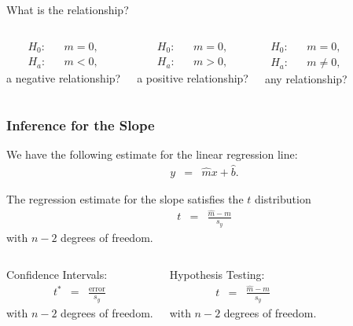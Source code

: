 \begin{frame}{What is the relationship?}


    \begin{columns}

      \begin{eqnarray*}
        H_0: & & m=0, \\
        H_a: & & m<0,
      \end{eqnarray*}
      a negative relationship?


      \begin{eqnarray*}
        H_0: & & m=0, \\
        H_a: & & m>0,
      \end{eqnarray*}
      a positive relationship?



      \begin{eqnarray*}
        H_0: & & m=0, \\
        H_a: & & m\neq 0,
      \end{eqnarray*}
      any relationship?

      
    \end{columns}

  
\end{frame}

\begin{frame}
  \frametitle{Inference for the Slope}

  We have the following estimate for the linear regression line:
  \begin{eqnarray*}
    y & = & \hat{m} x + \hat{b}.
  \end{eqnarray*}

  \begin{definition}
    The regression estimate for the slope satisfies the $t$ distribution
    \begin{eqnarray*}
      t & = & \frac{\hat{m}-m}{s_y}
    \end{eqnarray*}
    with $n-2$ degrees of freedom.
  \end{definition}

  \begin{columns}

    Confidence Intervals:
    \begin{eqnarray*}
      t^* & = & \frac{\mathrm{error}}{s_y}
    \end{eqnarray*}
    with $n-2$ degrees of freedom.


    Hypothesis Testing:
    \begin{eqnarray*}
      t & = & \frac{\hat{m}-m}{s_y}
    \end{eqnarray*}
    with $n-2$ degrees of freedom.

    
  \end{columns}

\end{frame}


